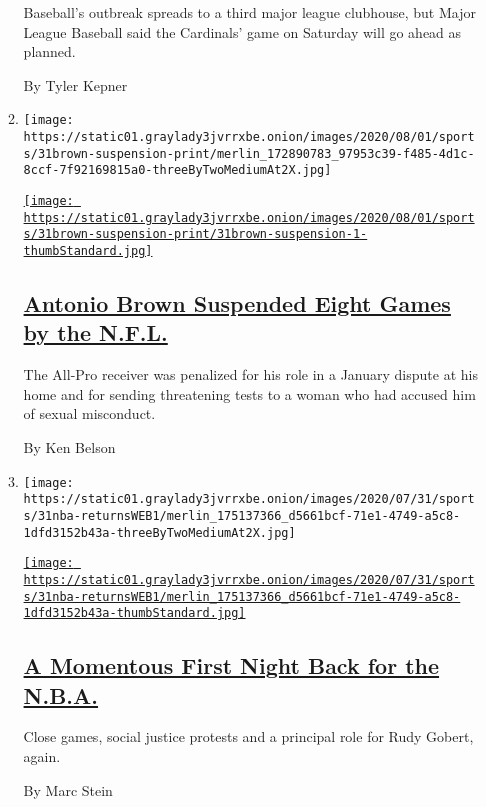 \begin{enumerate}
\begin{enumerate}
    Baseball's outbreak spreads to a third major league clubhouse, but
    Major League Baseball said the Cardinals' game on Saturday will go
    ahead as planned.

    By Tyler Kepner
  \item
    \texttt{[image: https://static01.graylady3jvrrxbe.onion/images/2020/08/01/sports/31brown-suspension-print/merlin\_172890783\_97953c39-f485-4d1c-8ccf-7f92169815a0-threeByTwoMediumAt2X.jpg]}

    \href{/2020/07/31/sports/football/antonio-brown-suspension-nfl.html}{\texttt{[image: https://static01.graylady3jvrrxbe.onion/images/2020/08/01/sports/31brown-suspension-print/31brown-suspension-1-thumbStandard.jpg]}}

    \hypertarget{antonio-brown-suspended-eight-games-by-the-nfl}{%
    \subsection{\texorpdfstring{\href{/2020/07/31/sports/football/antonio-brown-suspension-nfl.html}{Antonio
    Brown Suspended Eight Games by the
    N.F.L.}}{Antonio Brown Suspended Eight Games by the N.F.L.}}\label{antonio-brown-suspended-eight-games-by-the-nfl}}

    The All-Pro receiver was penalized for his role in a January dispute
    at his home and for sending threatening tests to a woman who had
    accused him of sexual misconduct.

    By Ken Belson
  \item
    \texttt{[image: https://static01.graylady3jvrrxbe.onion/images/2020/07/31/sports/31nba-returnsWEB1/merlin\_175137366\_d5661bcf-71e1-4749-a5c8-1dfd3152b43a-threeByTwoMediumAt2X.jpg]}

    \href{/2020/07/31/sports/basketball/nba-opening-night.html}{\texttt{[image: https://static01.graylady3jvrrxbe.onion/images/2020/07/31/sports/31nba-returnsWEB1/merlin\_175137366\_d5661bcf-71e1-4749-a5c8-1dfd3152b43a-thumbStandard.jpg]}}

    \hypertarget{a-momentous-first-night-back-for-the-nba}{%
    \subsection{\texorpdfstring{\href{/2020/07/31/sports/basketball/nba-opening-night.html}{A
    Momentous First Night Back for the
    N.B.A.}}{A Momentous First Night Back for the N.B.A.}}\label{a-momentous-first-night-back-for-the-nba}}

    Close games, social justice protests and a principal role for Rudy
    Gobert, again.

    By Marc Stein
  \end{enumerate}
\end{enumerate}

